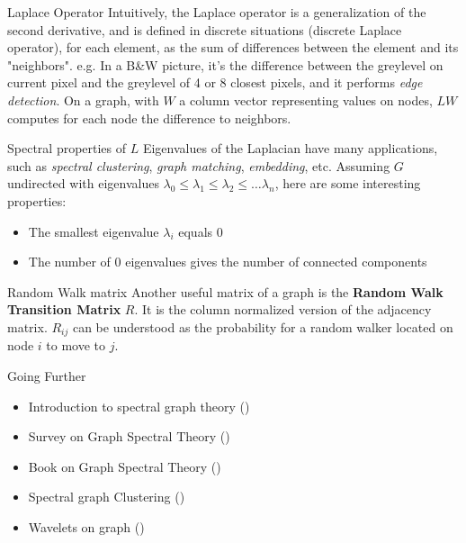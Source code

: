 \begin{textbox}{Laplace Operator}
  Intuitively, the Laplace operator is a generalization of the second derivative, and is defined in discrete situations (discrete Laplace operator), for each element, as the sum of differences between the element and its "neighbors". e.g. In a B\&W picture, it's the difference between the greylevel on current pixel and the greylevel of 4 or 8 closest pixels, and it performs \textit{edge detection}. On a graph, with $W$ a column vector representing values on nodes, $LW$ computes for each node the difference to neighbors.
\end{textbox}


\begin{textbox}{Spectral properties of $L$}
  Eigenvalues of the Laplacian have many applications, such as \textit{spectral clustering}, \textit{graph matching}, \textit{embedding}, etc. Assuming $G$ undirected with eigenvalues $\lambda_0 \leq \lambda_1 \leq \lambda_2 \leq \dots \lambda_n$, here are some interesting properties:
  \begin{itemize}
    \item The smallest eigenvalue $\lambda_i$ equals 0
    \item The number of 0 eigenvalues gives the number of connected components
  \end{itemize}
\end{textbox}


\begin{textbox}{Random Walk matrix}
  Another useful matrix of a graph is the \textbf{Random Walk Transition Matrix} $R$. It is the column normalized version of the adjacency matrix. $R_{ij}$ can be understood as the probability for a random walker located on node $i$ to move to $j$.
\end{textbox}


\begin{textbox}{Going Further}
  \begin{itemize}
    \item Introduction to spectral graph theory (\cite{nica2016brief})
    \item Survey on Graph Spectral Theory (\cite{spielman2012spectral})
    \item Book on Graph Spectral Theory (\cite{chung1997spectral})
    \item Spectral graph Clustering (\cite{nascimento2011spectral})
    \item Wavelets on graph (\cite{hammond2011wavelets})
  \end{itemize}
\end{textbox}